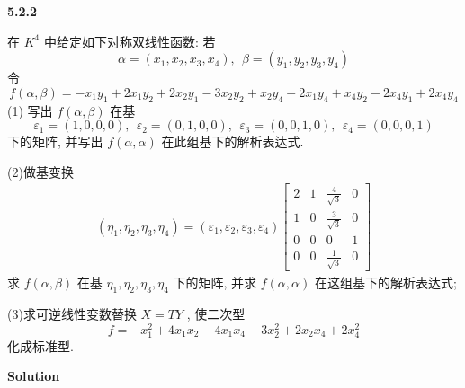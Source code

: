 \documentclass[11pt,a4paper,openany,oneside]{book}
\newcommand\Solution{\noindent\textbf{\textsf{Solution}}\par\medskip}
\begin{document}
\begin{myexample}
	\textbf{5.2.2}

在 $ K^4 $ 中给定如下对称双线性函数: 若
 $$  \alpha = (x_1, x_2, x_3, x_4), \ \ \beta = (y_1, y_2, y_3, y_4)  $$ 
令
 $$  f(\alpha, \beta) = -x_1y_1 + 2x_1y_2 + 2x_2y_1 - 3x_2y_2 + x_2y_4 - 2x_1y_4 + x_4y_2 - 2x_4y_1 + 2x_4y_4  $$ 
(1) 写出 $ f(\alpha, \beta) $ 在基
 $$  \varepsilon_1=(1,0,0,0), \ \ \varepsilon_2 =(0,1,0,0), \ \ \varepsilon_3=(0,0,1,0), \ \ \varepsilon_4=(0,0,0,1)  $$ 
下的矩阵, 并写出 $ f(\alpha, \alpha) $ 在此组基下的解析表达式. 

(2)做基变换
\begin{gather*}
(\eta_1, \eta_2, \eta_3, \eta_4) = (\varepsilon_1, \varepsilon_2, \varepsilon_3, \varepsilon_4)
\begin{bmatrix}
2  &  1  &  \tfrac{4}{\sqrt{3}} &  0  \\
1  &  0  &  \tfrac{3}{\sqrt{3}} &  0  \\
0  &  0  &  0  &  1  \\
0  &  0  &  \tfrac{1}{\sqrt{3}} & 0
\end{bmatrix}
\end{gather*}
求 $ f(\alpha, \beta) $ 在基 $ \eta_1, \eta_2, \eta_3, \eta_4 $ 下的矩阵, 并求 $ f(\alpha, \alpha) $ 在这组基下的解析表达式;

(3)求可逆线性变数替换 $ X=TY $ , 使二次型
 $$  f = -x_1^2 + 4x_1x_2 - 4x_1x_4 - 3x_2^2 + 2x_2x_4 + 2x_4^2  $$ 
化成标准型.    \\

\end{myexample}
\Solution 
\end{document}
